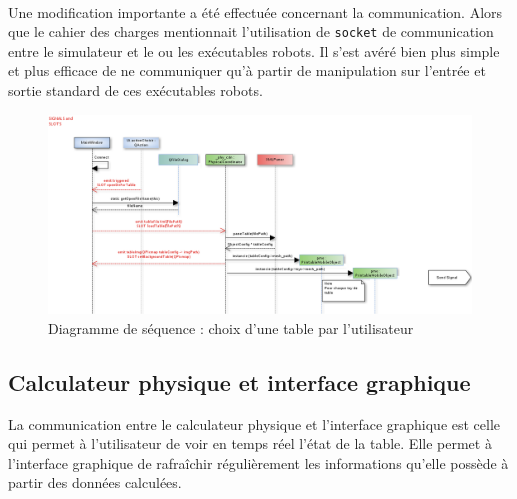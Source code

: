 \paragraph{} 
Une modification importante a été effectuée concernant la communication. Alors que le cahier des charges mentionnait l'utilisation de \texttt{socket} de communication entre le simulateur et le ou les exécutables robots. Il s'est avéré bien plus simple et plus efficace de ne communiquer qu'à partir de manipulation sur l'entrée et sortie standard de ces exécutables robots.

\begin{figure}[!h]
\includegraphics[scale=0.5]{DiagSeqOpenTable.png}
\caption{Diagramme de séquence : choix d'une table par l'utilisateur}
\label{seqopentable}
\end{figure}
\clearpage


\subsection{Calculateur physique et interface graphique}
\label{calcgui}
La communication entre le calculateur physique et l'interface graphique est celle qui permet à l'utilisateur de voir en temps réel l'état de la table. Elle permet à l'interface graphique de rafraîchir régulièrement les informations qu'elle possède à partir des données calculées.

